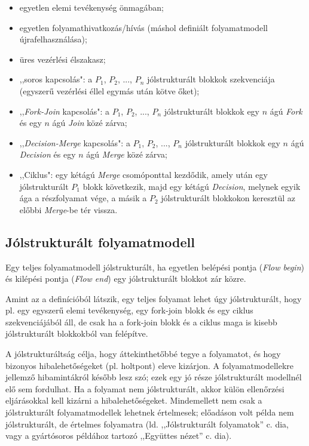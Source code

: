 \begin{itemize}
\item egyetlen elemi tevékenység önmagában;
\item egyetlen folyamathivatkozás/hívás (máshol definiált folyamatmodell újrafelhasználása);
\item üres vezérlési élszakasz;
\item ,,soros kapcsolás": a $P_1$, $P_2$, ..., $P_n$ jólstrukturált blokkok szekvenciája (egyszerű vezérlési éllel egymás után kötve őket);
\item ,,\emph{Fork-Join} kapcsolás": a $P_1$, $P_2$, ..., $P_n$ jólstrukturált blokkok egy $n$ ágú \emph{Fork} és egy $n$ ágú \emph{Join} közé zárva;
\item ,,\emph{Decision-Merge} kapcsolás": a $P_1$, $P_2$, ..., $P_n$ jólstrukturált blokkok egy $n$ ágú \emph{Decision} és egy $n$ ágú \emph{Merge} közé zárva;
\item ,,Ciklus": egy kétágú \emph{Merge} csomóponttal kezdődik, amely után egy jólstrukturált $P_1$ blokk következik, majd egy kétágú \emph{Decision}, melynek egyik ága a részfolyamat vége, a másik a $P_2$ jólstrukturált blokkokon keresztül az előbbi \emph{Merge}-be tér vissza.
\end{itemize}

\subsection{Jólstrukturált folyamatmodell}

Egy teljes folyamatmodell jólstrukturált, ha egyetlen belépési pontja (\emph{Flow begin}) és kilépési pontja (\emph{Flow end}) egy jólstrukturált blokkot zár közre.

Amint az a definícióból látszik, egy teljes folyamat lehet úgy jólstrukturált, hogy pl. egy egyszerű elemi tevékenység, egy fork-join blokk és egy ciklus szekvenciájából áll, de csak ha a fork-join blokk és a ciklus maga is kisebb jólstrukturált blokkokból van felépítve.

A jólstrukturáltság célja, hogy áttekinthetőbbé tegye a folyamatot, és hogy bizonyos hibalehetőségeket (pl. holtpont) eleve kizárjon. A folyamatmodellekre jellemző hibamintákról később lesz szó; ezek egy jó része jólstrukturált modellnél elő sem fordulhat. Ha a folyamat nem jólstrukturált, akkor külön ellenőrzési eljárásokkal kell kizárni a hibalehetőségeket. Mindemellett nem csak a jólstrukturált folyamatmodellek lehetnek értelmesek; előadáson volt példa nem jólstrukturált, de értelmes folyamatra (ld. ,,Jólstrukturált folyamatok'' c. dia, vagy a gyártósoros példához tartozó ,,Együttes nézet'' c. dia).

